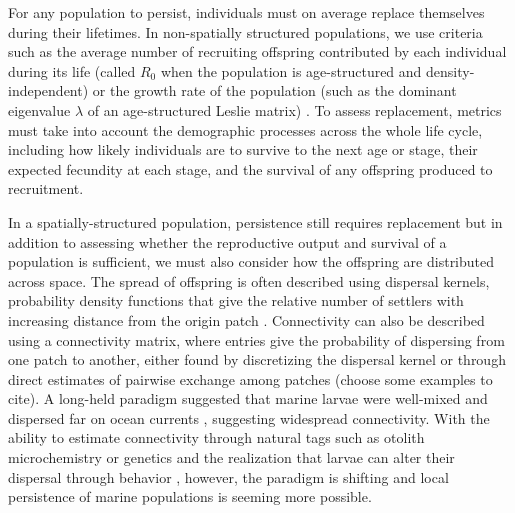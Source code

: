 \documentclass[12pt, oneside]{article}   	%
\begin{document}
For any population to persist, individuals must on average replace themselves during their lifetimes. In non-spatially structured populations, we use criteria such as the average number of recruiting offspring contributed by each individual during its life (called $R_0$ when the population is age-structured and density-independent) or the growth rate of the population (such as the dominant eigenvalue $\lambda$ of an age-structured Leslie matrix) \citep{caswell_matrix_2001, burgess2014beyond}. To assess replacement, metrics must take into account the demographic processes across the whole life cycle, including how likely individuals are to survive to the next age or stage, their expected fecundity at each stage, and the survival of any offspring produced to recruitment. %

In a spatially-structured population, persistence still requires replacement but in addition to assessing whether the reproductive output and survival of a population is sufficient, we must also consider how the offspring are distributed across space. The spread of offspring is often described using dispersal kernels, probability density functions that give the relative number of settlers with increasing distance from the origin patch \citep[e.g.][]{bode2018estimating}. Connectivity can also be described using a connectivity matrix, where entries give the probability of dispersing from one patch to another, either found by discretizing the dispersal kernel or through direct estimates of pairwise exchange among patches (choose some examples to cite). A long-held paradigm suggested that marine larvae were well-mixed and dispersed far on ocean currents \citep{roughgarden_recruitment_1988}, suggesting widespread connectivity. With the ability to estimate connectivity through natural tags such as otolith microchemistry or genetics and the realization that larvae can alter their dispersal through behavior \citep[e.g.][]{morgan_nearshore_2009}, however, the paradigm is shifting and local persistence of marine populations is seeming more possible. %
\end{document}
